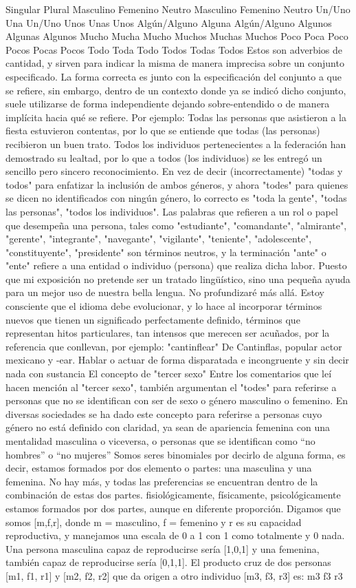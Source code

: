 Singular	Plural
Masculino	Femenino	Neutro	Masculino	Femenino	Neutro
Un/Uno	Una	Un/Uno	Unos	Unas	Unos
Algún/Alguno	Alguna	Algún/Alguno	Algunos	Algunas	Algunos
Mucho	Mucha	Mucho	Muchos	Muchas	Muchos
Poco	Poca	Poco	Pocos	Pocas	Pocos
Todo	Toda	Todo	Todos	Todas	Todos
Estos son adverbios de cantidad, y sirven para indicar la misma de manera imprecisa sobre un conjunto especificado. La forma correcta es junto con la especificación del conjunto a que se refiere, sin embargo, dentro de un contexto donde ya se indicó dicho conjunto, suele utilizarse de forma independiente dejando sobre-entendido o de manera implícita hacia qué se refiere. Por ejemplo:
Todas las personas que asistieron a la fiesta estuvieron contentas, por lo que se entiende que todas (las personas) recibieron un buen trato.
Todos los individuos pertenecientes a la federación han demostrado su lealtad, por lo que a todos (los individuos) se les entregó un sencillo pero sincero reconocimiento.
En vez de decir (incorrectamente) "todas y todos" para enfatizar la inclusión de ambos géneros, y ahora "todes" para quienes se dicen no identificados con ningún género, lo correcto es "toda la gente", "todas las personas", "todos los individuos".
Las palabras que refieren a un rol o papel que desempeña una persona, tales como "estudiante", "comandante", "almirante", "gerente", "integrante", "navegante", "vigilante", "teniente", "adolescente", "constituyente", "presidente" son términos neutros, y la terminación "ante" o "ente" refiere a una entidad o individuo (persona) que realiza dicha labor.
Puesto que mi exposición no pretende ser un tratado lingüístico, sino una pequeña ayuda para un mejor uso de nuestra bella lengua. No profundizaré más allá. Estoy consciente que el idioma debe evolucionar, y lo hace al incorporar términos nuevos que tienen un significado perfectamente definido, términos que representan hitos particulares, tan intensos que merecen ser acuñados, por la referencia que conllevan, por ejemplo:
"cantinflear" De Cantinflas, popular actor mexicano y -ear. Hablar o actuar de forma disparatada e incongruente y sin decir nada con sustancia
El concepto de "tercer sexo"
Entre los comentarios que leí hacen mención al "tercer sexo", también argumentan el "todes" para referirse a personas que no se identifican con ser de sexo o género masculino o femenino.
En diversas sociedades se ha dado este concepto para referirse a personas cuyo género no está definido con claridad, ya sean de apariencia femenina con una mentalidad masculina o viceversa, o personas que se identifican como “no hombres” o “no mujeres”
Somos seres binomiales por decirlo de alguna forma, es decir, estamos formados por dos elemento o partes: una masculina y una femenina. No hay más, y todas las preferencias se encuentran dentro de la combinación de estas dos partes. fisiológicamente, físicamente, psicológicamente estamos formados por dos partes, aunque en diferente proporción.
Digamos que somos [m,f,r], donde m = masculino, f = femenino y r es su capacidad reproductiva, y manejamos una escala de 0 a 1 con 1 como totalmente y 0 nada. Una persona masculina capaz de reproducirse sería [1,0,1] y una femenina, también capaz de reproducirse sería [0,1,1].
El producto cruz de dos personas [m1, f1, r1] y [m2, f2, r2] que da origen a otro individuo [m3, f3, r3] es:
m3
f3
r3

